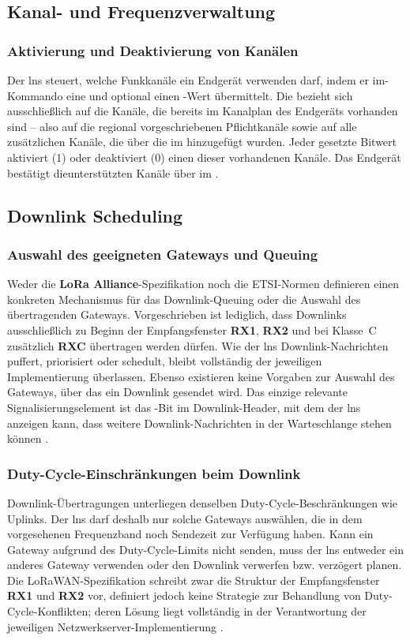 \subsection{Kanal- und Frequenzverwaltung}
\subsubsection{Aktivierung und Deaktivierung von Kanälen}
	Der \ac{lns} steuert, welche Funkkanäle ein Endgerät verwenden darf, indem er im-Kommando eine  und optional einen -Wert übermittelt. Die  bezieht sich ausschlie{\ss}lich auf die Kanäle, die bereits im Kanalplan des Endgeräts vorhanden sind – also auf die regional vorgeschriebenen Pflichtkanäle sowie auf alle zusätzlichen Kanäle, die über die  im hinzugefügt wurden. Jeder gesetzte Bitwert aktiviert (1) oder deaktiviert (0) einen dieser vorhandenen Kanäle. Das Endgerät bestätigt dieunterstützten Kanäle über  im . 

\subsection{Downlink Scheduling}
\subsubsection{Auswahl des geeigneten Gateways und Queuing}
	Weder die \textbf{LoRa Alliance}-Spezifikation noch die ETSI-Normen definieren einen konkreten Mechanismus für das Downlink-Queuing oder die Auswahl des übertragenden Gateways. Vorgeschrieben ist lediglich, dass Downlinks ausschlie{\ss}lich zu Beginn der Empfangsfenster \textbf{RX1}, \textbf{RX2} und bei Klasse~C zusätzlich \textbf{RXC} übertragen werden dürfen. Wie der \ac{lns} Downlink-Nachrichten puffert, priorisiert oder schedult, bleibt vollständig der jeweiligen Implementierung überlassen. Ebenso existieren keine Vorgaben zur Auswahl des Gateways, über das ein Downlink gesendet wird. Das einzige relevante Signalisierungselement ist das -Bit im Downlink-Header, mit dem der \ac{lns} anzeigen kann, dass weitere Downlink-Nachrichten in der Warteschlange stehen können \cite{LoRaAlliance:2020b}.

\subsubsection{Duty-Cycle-Einschränkungen beim Downlink}
	Downlink-Übertragungen unterliegen denselben Duty-Cycle-Beschränkungen wie Uplinks. Der \ac{lns} darf deshalb nur solche Gateways auswählen, die in dem vorgesehenen Frequenzband noch Sendezeit zur Verfügung haben. Kann ein Gateway aufgrund des Duty-Cycle-Limits nicht senden, muss der \ac{lns} entweder ein anderes Gateway verwenden oder den Downlink verwerfen bzw. verzögert planen. Die LoRaWAN-Spezifikation schreibt zwar die Struktur der Empfangsfenster \textbf{RX1} und \textbf{RX2} vor, definiert jedoch keine Strategie zur Behandlung von Duty-Cycle-Konflikten; deren Lösung liegt vollständig in der Verantwortung der jeweiligen Netzwerkserver-Implementierung \cite{ETSI:2018b}.

